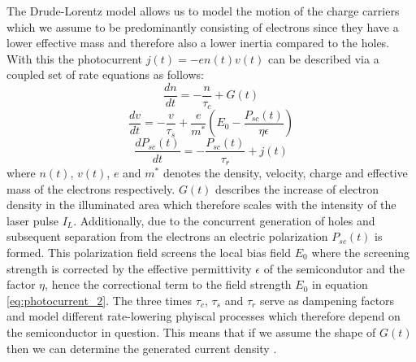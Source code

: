 The Drude-Lorentz model allows us to model the motion of the charge carriers which we assume to be predominantly consisting of electrons since they have a lower effective mass and therefore also a lower inertia compared to the holes. With this the photocurrent $j(t) = -e n(t) v(t)$ can be described via a coupled set of rate equations as follows:
\begin{equation}
    \frac{dn}{dt} = - \frac{n}{\tau_c} + G(t)
\end{equation}
\begin{equation}
    \label{eq:photocurrent_2}
    \frac{dv}{dt} = - \frac{v}{\tau_s} + \frac{e}{m^*}\left(E_0 - \frac{P_{sc}(t)}{\eta \epsilon} \right)
\end{equation}
\begin{equation}
    \frac{dP_{sc}(t)}{dt} = -\frac{P_{sc}(t)}{\tau_r}+j(t)
\end{equation}
where $n(t)$, $v(t)$, $e$ and $m^*$ denotes the density, velocity, charge and effective mass of the electrons respectively. $G(t)$ describes the increase of electron density in the illuminated area which therefore scales with the intensity of the laser pulse $I_L$. Additionally, due to the concurrent generation of holes and subsequent separation from the electrons an electric polarization $P_{sc}(t)$ is formed. This polarization field screens the local bias field $E_0$ where the screening strength is corrected by the effective permittivity $\epsilon$ of the semicondutor and the factor $\eta$, hence the correctional term to the field strength $E_0$ in equation \ref{eq:photocurrent_2}. The three times $\tau_c$, $\tau_s$ and $\tau_r$ serve as dampening factors and model different rate-lowering phyiscal processes which therefore depend on the semiconductor in question. This means that if we assume the shape of $G(t)$ then we can determine the generated current density \cite{Rutz2007}.

